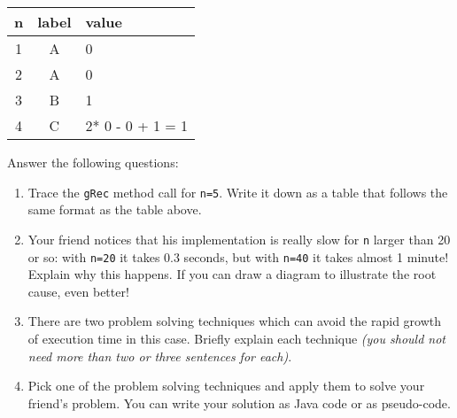 \documentclass[a4paper]{article}
\newcounter{question}
\begin{document}
\begin{center}
  \begin{tabular}{|c|c|l|}
    \hline
    n & label & value \\
    \hline
    1  & A & 0 \\
    2  & A & 0 \\
    3  & B & 1 \\
    4  & C & 2* 0 - 0 + 1 = 1 \\
    \hline
  \end{tabular}
\end{center}

Answer the following questions:

\begin{enumerate}
\item
  Trace the \texttt{gRec} method call for \texttt{n=5}.
  Write it down as a table that follows the same format as the table above.
\item
  Your friend notices that his implementation is really slow for \texttt{n} larger than 20 or so:
  with \texttt{n=20} it takes 0.3 seconds, but with \texttt{n=40} it takes almost 1 minute!
  Explain why this happens.
  If you can draw a diagram to illustrate the root cause, even better!
\item
  There are two problem solving techniques which can avoid the rapid growth of execution time in this case.
  Briefly explain each technique \emph{(you should not need more than two or three  sentences for each)}.
\item
  Pick one of the problem solving techniques and apply them to solve your friend's problem.
  You can write your solution as Java code or as pseudo-code.
\end{enumerate}
\end{document}
